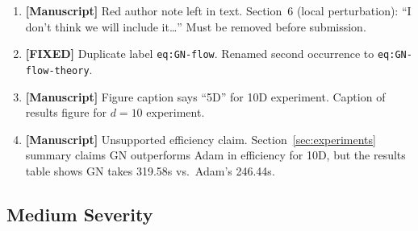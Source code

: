 \documentclass[twoside,11pt]{article}
\begin{document}
\begin{enumerate}
\item {\color{red}\textbf{[Manuscript]} Red author note left in text.}
    Section~6 (local perturbation): ``I don't think we will include it\ldots''
    Must be removed before submission.

\item {\color{green!50!black}\textbf{[FIXED]} Duplicate label \texttt{eq:GN-flow}.}
    Renamed second occurrence to \texttt{eq:GN-flow-theory}.

\item {\color{red}\textbf{[Manuscript]} Figure caption says ``5D'' for 10D experiment.}
    Caption of results figure for $d=10$ experiment.

\item {\color{red}\textbf{[Manuscript]} Unsupported efficiency claim.}
    Section~\ref{sec:experiments} summary claims GN outperforms Adam in efficiency for 10D,
    but the results table shows GN takes 319.58s vs.\ Adam's 246.44s.
\end{enumerate}

\subsection*{Medium Severity}
\end{document}
